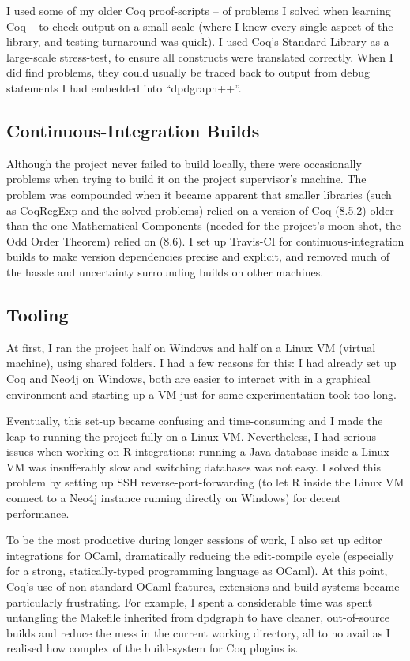 I used some of my older Coq proof-scripts -- of problems I solved when learning
Coq -- to check output on a small scale (where I knew every single aspect of the
library, and testing turnaround was quick). I used Coq's Standard Library as a
large-scale stress-test, to ensure all constructs were translated correctly.
When I did find problems, they could usually be traced back to output from debug
statements I had embedded into ``dpdgraph++''.

\subsection{Continuous-Integration Builds}

Although the project never failed to build locally, there were occasionally
problems when trying to build it on the project supervisor's machine. The
problem was compounded when it became apparent that smaller libraries (such as
CoqRegExp and the solved problems) relied on a version of Coq (8.5.2) older than
the one Mathematical Components (needed for the project's moon-shot, the Odd
Order Theorem) relied on (8.6). I set up Travis-CI for continuous-integration
builds to make version dependencies precise and explicit, and removed much of
the hassle and uncertainty surrounding builds on other machines.

\subsection{Tooling}

At first, I ran the project half on Windows and half on a Linux VM (virtual
machine), using shared folders. I had a few reasons for this: I had already set
up Coq and Neo4j on Windows, both are easier to interact with in a graphical
environment and starting up a VM just for some experimentation took too long.

Eventually, this set-up became confusing and time-consuming and I made the leap
to running the project fully on a Linux VM. Nevertheless, I had serious issues
when working on R integrations: running a Java database inside a Linux VM was
insufferably slow and switching databases was not easy. I solved this problem by
setting up SSH reverse-port-forwarding (to let R inside the Linux VM connect to
a Neo4j instance running directly on Windows) for decent performance.

To be the most productive during longer sessions of work, I also set up editor
integrations for OCaml, dramatically reducing the edit-compile cycle (especially
for a strong, statically-typed programming language as OCaml). At this point,
Coq's use of non-standard OCaml features, extensions and build-systems became
particularly frustrating. For example, I spent a considerable time was spent
untangling the Makefile inherited from dpdgraph to have cleaner, out-of-source
builds and reduce the mess in the current working directory, all to no avail as
I realised how complex of the build-system for Coq plugins is.

